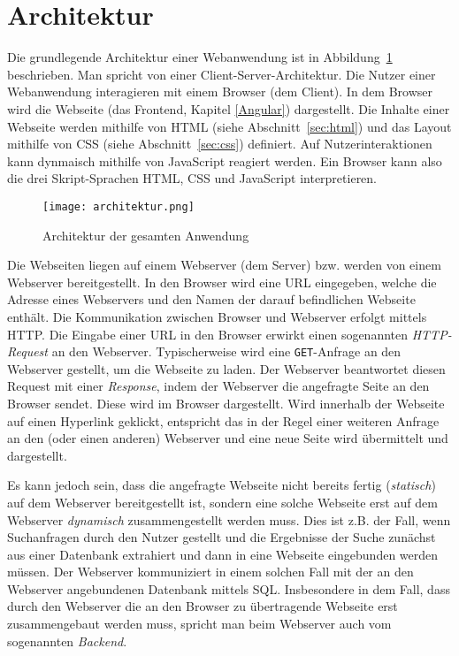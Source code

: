 \section{Architektur}

Die grundlegende Architektur einer Webanwendung ist in Abbildung~\ref{img:architektur} beschrieben. Man spricht von einer Client-Server-Architektur. Die Nutzer einer Webanwendung interagieren mit einem Browser (dem Client). In dem Browser wird die Webseite (das Frontend, Kapitel \ref{Angular}) dargestellt. Die Inhalte einer Webseite werden mithilfe von \ac{HTML} (siehe Abschnitt~\ref{sec:html}) und das Layout mithilfe von \ac{CSS} (siehe Abschnitt~\ref{sec:css}) definiert. Auf Nutzerinteraktionen kann dynmaisch mithilfe von JavaScript reagiert werden. Ein Browser kann also die drei Skript-Sprachen HTML, CSS und JavaScript interpretieren.

\begin{figure}[htbp]
    \centering
    \texttt{[image: architektur.png]}
    \caption{Architektur der gesamten Anwendung}
    \label{img:architektur}
\end{figure}

Die Webseiten liegen auf einem Webserver (dem Server) bzw. werden von einem Webserver bereitgestellt. In den Browser wird eine \ac{URL} eingegeben, welche die Adresse eines Webservers und den Namen der darauf befindlichen Webseite enthält. Die Kommunikation zwischen Browser und Webserver erfolgt mittels \ac{HTTP}. Die Eingabe einer URL in den Browser erwirkt einen sogenannten \textit{HTTP-Request} an den Webserver. Typischerweise wird eine \texttt{GET}-Anfrage an den Webserver gestellt, um die Webseite zu laden. Der Webserver beantwortet diesen Request mit einer \textit{Response}, indem der Webserver die angefragte Seite an den Browser sendet. Diese wird im Browser dargestellt. Wird innerhalb der Webseite auf einen Hyperlink geklickt, entspricht das in der Regel einer weiteren Anfrage an den (oder einen anderen) Webserver und eine neue Seite wird übermittelt und dargestellt.

Es kann jedoch sein, dass die angefragte Webseite nicht bereits fertig (\textit{statisch}) auf dem Webserver bereitgestellt ist, sondern eine solche Webseite erst auf dem Webserver \textit{dynamisch} zusammengestellt werden muss. Dies ist z.B. der Fall, wenn Suchanfragen durch den Nutzer gestellt und die Ergebnisse der Suche zunächst aus einer Datenbank extrahiert und dann in eine Webseite eingebunden werden müssen. Der Webserver kommuniziert in einem solchen Fall mit der an den Webserver angebundenen Datenbank mittels \ac{SQL}. Insbesondere in dem Fall, dass durch den Webserver die an den Browser zu übertragende Webseite erst \glqq zusammengebaut\grqq{} werden muss, spricht man beim Webserver auch vom sogenannten \textit{Backend}.

